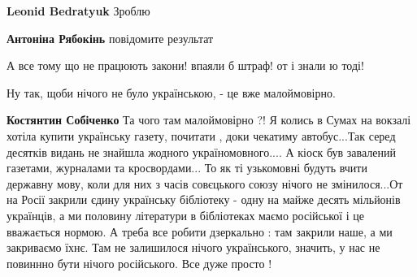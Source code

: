 \begin{itemize}
\begin{itemize}
\begin{itemize}
 
\textbf{Leonid Bedratyuk} Зроблю

 
\textbf{Антоніна Рябокінь} повідомите результат
\end{itemize}

\end{itemize}

 
А все тому що не працюють закони! впаяли б штраф! от і знали ю тоді!

 
Ну так, щоби нічого не було українською, - це вже малоймовірно.

\begin{itemize}
 
\textbf{Костянтин Собіченко} Та чого там малоймовірно ?! Я колись в Сумах на
вокзалі хотіла купити українську газету, почитати , доки чекатиму автобус...Так
серед десятків видань не знайшла жодного україномовного.... А кіоск був
завалений газетами, журналами та кросвордами... То як ті узькомовні будуть вчити
державну мову, коли для них з часів совєцького союзу нічого не змінилося...От
на Росії закрили єдину українську бібліотеку - одну на майже десять мільйонів
українців, а ми половину літератури в бібліотеках маємо російської і це
вважається нормою. А треба все робити дзеркально : там закрили наше, а ми
закриваємо їхнє. Там не залишилося нічого українського, значить, у нас не
повиннно бути нічого російського. Все дуже просто !


\end{itemize}
\end{itemize}
